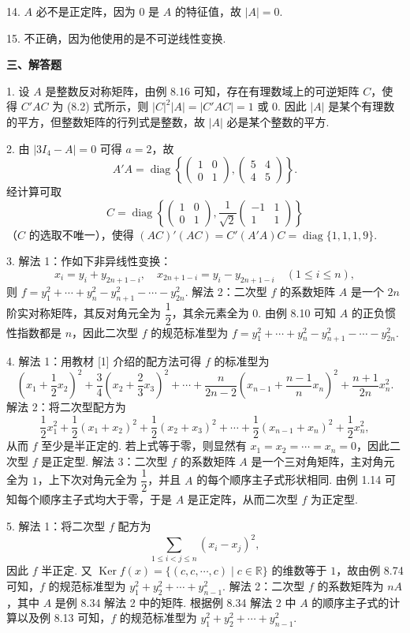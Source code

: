 \documentclass[UTF8,12pt,a4paper,fontset=fandol]{ctexart}
\begin{document}
14. $A$ 必不是正定阵，因为 $0$ 是 $A$ 的特征值，故 $|A|=0$.

15. 不正确，因为他使用的是不可逆线性变换.

\noindent\textbf{三、解答题}

1. 设 $A$ 是整数反对称矩阵，由例 8.16 可知，存在有理数域上的可逆矩阵 $C$，使得 $C'AC$ 为 (8.2) 式所示，则 $|C|^2|A|=|C'AC|=1$ 或 $0$. 因此 $|A|$ 是某个有理数的平方，但整数矩阵的行列式是整数，故 $|A|$ 必是某个整数的平方.

2. 由 $|3I_4-A|=0$ 可得 $a=2$，故
\[
A'A=\operatorname{diag}\left\{\left(\begin{array}{cc}1&0\\ 0&1\end{array}\right),
\left(\begin{array}{cc}5&4\\ 4&5\end{array}\right)\right\}.
\]
经计算可取
\[
C=\operatorname{diag}\left\{\left(\begin{array}{cc}1&0\\ 0&1\end{array}\right),
\frac1{\sqrt2}\left(\begin{array}{cc}-1&1\\ 1&1\end{array}\right)\right\}
\]
（$C$ 的选取不唯一），使得 $(AC)'(AC)=C'(A'A)C=\operatorname{diag}\{1,1,1,9\}$.

3. 解法 1：作如下非异线性变换：
\[
x_i=y_i+y_{2n+1-i},\quad x_{2n+1-i}=y_i-y_{2n+1-i}\quad (1\le i\le n),
\]
则 $f=y_1^2+\cdots+y_n^2-y_{n+1}^2-\cdots-y_{2n}^2$.
解法 2：二次型 $f$ 的系数矩阵 $A$ 是一个 $2n$ 阶实对称矩阵，其反对角元全为 $\dfrac12$，其余元素全为 $0$. 由例 8.10 可知 $A$ 的正负惯性指数都是 $n$，因此二次型 $f$ 的规范标准型为 $f=y_1^2+\cdots+y_n^2-y_{n+1}^2-\cdots-y_{2n}^2$.

4. 解法 1：用教材 [1] 介绍的配方法可得 $f$ 的标准型为
\[
\left(x_1+\frac12x_2\right)^2+\frac34\left(x_2+\frac23x_3\right)^2+\cdots+
\frac{n}{2n-2}\left(x_{n-1}+\frac{n-1}{n}x_n\right)^2+\frac{n+1}{2n}x_n^2.
\]
解法 2：将二次型配方为
\[
\frac12x_1^2+\frac12(x_1+x_2)^2+\frac12(x_2+x_3)^2+\cdots+\frac12(x_{n-1}+x_n)^2+\frac12x_n^2,
\]
从而 $f$ 至少是半正定的. 若上式等于零，则显然有 $x_1=x_2=\cdots=x_n=0$，因此二次型 $f$ 是正定型.
解法 3：二次型 $f$ 的系数矩阵 $A$ 是一个三对角矩阵，主对角元全为 $1$，上下次对角元全为 $\dfrac12$，并且 $A$ 的每个顺序主子式形状相同. 由例 1.14 可知每个顺序主子式均大于零，于是 $A$ 是正定阵，从而二次型 $f$ 为正定型.

5. 解法 1：将二次型 $f$ 配方为
\[
\sum_{1\le i<j\le n}(x_i-x_j)^2,
\]
因此 $f$ 半正定. 又 $\operatorname{Ker}f(x)=\{(c,c,\cdots,c)\mid c\in\mathbb{R}\}$ 的维数等于 $1$，故由例 8.74 可知，$f$ 的规范标准型为 $y_1^2+y_2^2+\cdots+y_{n-1}^2$.
解法 2：二次型 $f$ 的系数矩阵为 $nA$，其中 $A$ 是例 8.34 解法 2 中的矩阵. 根据例 8.34 解法 2 中 $A$ 的顺序主子式的计算以及例 8.13 可知，$f$ 的规范标准型为 $y_1^2+y_2^2+\cdots+y_{n-1}^2$.
\end{document}
